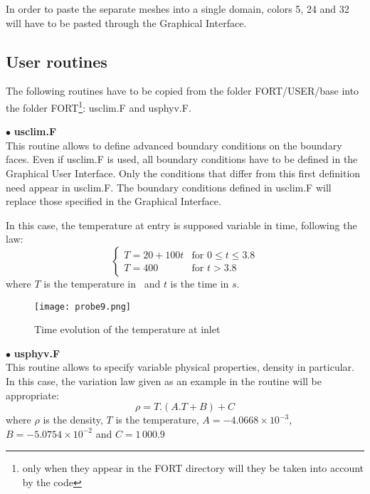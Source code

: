 In order to paste the separate meshes into a single domain, colors 5, 24 and 32
will have to be pasted through the Graphical Interface.


        \subsection{User routines}

The following routines have to be copied from the folder FORT/USER/base into the
folder FORT\footnote{only when they appear in the FORT directory will they be
taken into account by the code}: usclim.F and usphyv.F.

$\bullet$ {\bfseries usclim.F}\\
This routine allows to define advanced boundary conditions on the boundary
faces. Even if usclim.F is used, all boundary conditions have to be defined in
the Graphical User Interface. Only the conditions that differ from this first
definition need appear in usclim.F. The boundary conditions defined in usclim.F
will replace those specified in the Graphical Interface.

In this case, the temperature at entry is supposed variable in time, following
the law:
\begin{equation}
\left\{\begin{array}{ll}
T = 20 + 100t & \text{for }0\leqslant t \leqslant 3.8\\
T = 400 & \text{for } t > 3.8
\end{array}\right.
\end{equation}
where $T$ is the temperature in \degresC\ and $t$ is the time in $s$.


\begin{figure}[h!]
\begin{center}
\texttt{[image: probe9.png]}
\caption{Time evolution of the temperature at inlet}
\label{figp9_e3}
\end{center}
\end{figure}


$\bullet$ {\bfseries usphyv.F}\\
This routine allows to specify variable physical properties, density in
particular. In this case, the variation law given as an example in the routine
will be appropriate:
\begin{equation}
\rho = T.(A.T + B) + C
\end{equation}
where $\rho$ is the density, $T$ is the temperature, $A = -4.0668\times10^{-3}$,
$B =-5.0754\times 10^{-2}$ and $C = 1\,000.9$

